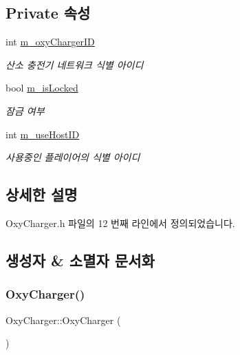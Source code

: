 \subsection*{Private 속성}
\begin{DoxyCompactItemize}
\item 
int \hyperlink{class_oxy_charger_a7229fb2e4423cad1f648bd710ee8d092}{m\+\_\+oxy\+Charger\+ID}
\begin{DoxyCompactList}\small\item\em 산소 충전기 네트워크 식별 아이디 \end{DoxyCompactList}\item 
bool \hyperlink{class_oxy_charger_af976be20b7f8cd8cf9c6f59857ba2f48}{m\+\_\+is\+Locked}
\begin{DoxyCompactList}\small\item\em 잠금 여부 \end{DoxyCompactList}\item 
int \hyperlink{class_oxy_charger_af10a0504b33a8e3b6ded341cf067b9ad}{m\+\_\+use\+Host\+ID}
\begin{DoxyCompactList}\small\item\em 사용중인 플레이어의 식별 아이디 \end{DoxyCompactList}\end{DoxyCompactItemize}


\subsection{상세한 설명}


Oxy\+Charger.\+h 파일의 12 번째 라인에서 정의되었습니다.



\subsection{생성자 \& 소멸자 문서화}
\mbox{\label{class_oxy_charger_a3aa077d7dc2310cdc7006a178f92f1f7}} 
\subsubsection{\texorpdfstring{Oxy\+Charger()}{OxyCharger()}}
{\footnotesize\ttfamily Oxy\+Charger\+::\+Oxy\+Charger (\begin{DoxyParamCaption}{ }\end{DoxyParamCaption})}



